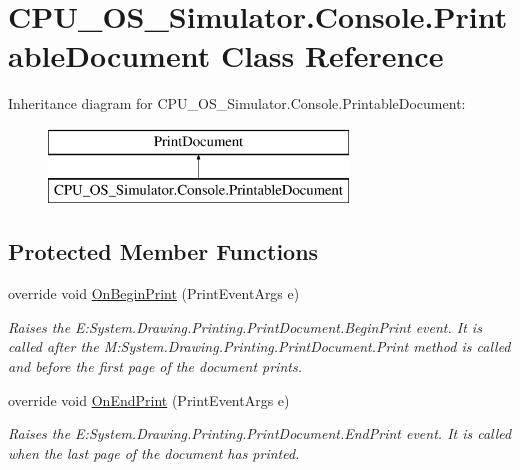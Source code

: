 \hypertarget{class_c_p_u___o_s___simulator_1_1_console_1_1_printable_document}{}\section{C\+P\+U\+\_\+\+O\+S\+\_\+\+Simulator.\+Console.\+Printable\+Document Class Reference}
\label{class_c_p_u___o_s___simulator_1_1_console_1_1_printable_document}
Inheritance diagram for C\+P\+U\+\_\+\+O\+S\+\_\+\+Simulator.\+Console.\+Printable\+Document\+:\begin{figure}[H]
\begin{center}
\leavevmode
\includegraphics[height=2.000000cm]{class_c_p_u___o_s___simulator_1_1_console_1_1_printable_document}
\end{center}
\end{figure}
\subsection*{Protected Member Functions}
\begin{DoxyCompactItemize}
\item 
override void \hyperlink{class_c_p_u___o_s___simulator_1_1_console_1_1_printable_document_a63d8f6a5ee9648e418dbc93859d2c746}{On\+Begin\+Print} (Print\+Event\+Args e)
\begin{DoxyCompactList}\small\item\em Raises the E\+:\+System.\+Drawing.\+Printing.\+Print\+Document.\+Begin\+Print event. It is called after the M\+:\+System.\+Drawing.\+Printing.\+Print\+Document.\+Print method is called and before the first page of the document prints. \end{DoxyCompactList}\item 
override void \hyperlink{class_c_p_u___o_s___simulator_1_1_console_1_1_printable_document_a3e2f3a86ac5c236c3c36a04910fb6ab1}{On\+End\+Print} (Print\+Event\+Args e)
\begin{DoxyCompactList}\small\item\em Raises the E\+:\+System.\+Drawing.\+Printing.\+Print\+Document.\+End\+Print event. It is called when the last page of the document has printed. \end{DoxyCompactList}\end{DoxyCompactItemize}

